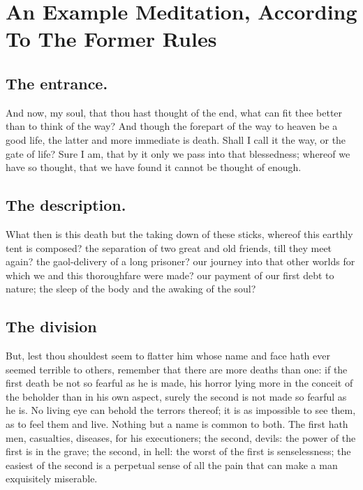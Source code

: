 \meditation
\chapter{An Example Meditation, According To The Former Rules}
\section{The entrance.}
And now, my soul, that thou hast thought of the end, what can fit thee better than to think of the way? And though the forepart of the way to heaven be a good life, the latter and more immediate is death. Shall I call it the way, or the gate of life? Sure I am, that by it only we pass into that blessedness; whereof we have so thought, that we have found it cannot be thought of enough. 

\section{The description.}
What then is this death but the taking down of these sticks, whereof this earthly tent is composed? the separation of two great and old friends, till they meet again? the gaol-delivery of a long prisoner? our journey into that other worlds for which we and this thoroughfare were made? our payment of our first debt to nature; the sleep of the body and the awaking of the soul? 

\section{The division}
But, lest thou shouldest seem to flatter him whose name and face hath ever seemed terrible to others, remember that there are more deaths than one: if the first death be not so fearful as he is made, his horror lying more in the conceit of the beholder than in his own aspect, surely the second is not made so fearful as he is. No living eye can behold the terrors thereof; it is as impossible to see them, as to feel them and live. Nothing but a name is common to both. The first hath men, casualties, diseases, for his executioners; the second, devils: the power of the first is in the grave; the second, in hell: the worst of the first is senselessness; the easiest of the second is a perpetual sense of all the pain that can make a man exquisitely miserable. 

